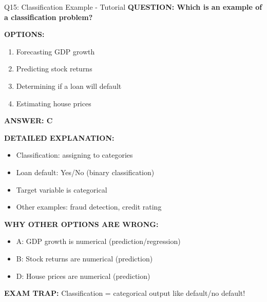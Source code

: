 \documentclass[8pt]{beamer}
\begin{document}
	\begin{frame}{Q15: Classification Example - Tutorial}
		\fontsize{6.5}{7.5}\selectfont
		\textbf{QUESTION: Which is an example of a classification problem?}
		
		\vspace{0.1cm}
		\textbf{OPTIONS:}
		\begin{enumerate}
			\item Forecasting GDP growth
			\item Predicting stock returns
			\item Determining if a loan will default
			\item Estimating house prices
		\end{enumerate}
		
		\vspace{0.1cm}
		\textcolor{myblue}{\textbf{ANSWER: C}}
		
		\vspace{0.1cm}
		\textbf{DETAILED EXPLANATION:}
		\begin{itemize}
			\item Classification: assigning to categories
			\item Loan default: Yes/No (binary classification)
			\item Target variable is categorical
			\item Other examples: fraud detection, credit rating
		\end{itemize}
		
		\vspace{0.1cm}
		\textcolor{myred}{\textbf{WHY OTHER OPTIONS ARE WRONG:}}
		\begin{itemize}
			\item \textcolor{myred}{A:} GDP growth is numerical (prediction/regression)
			\item \textcolor{myred}{B:} Stock returns are numerical (prediction)
			\item \textcolor{myred}{D:} House prices are numerical (prediction)
		\end{itemize}
		
		\textcolor{myred}{\textbf{EXAM TRAP:}} Classification = \textcolor{myblue}{categorical output} like default/no default!
	\end{frame}
	
\end{document}
